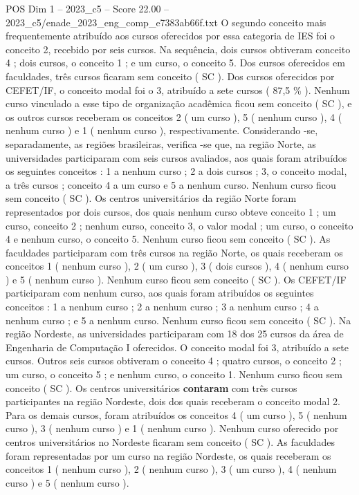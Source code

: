 \begin{textsample}{POS Dim 1 – 2023\_c5 – Score 22.00 – 2023\_c5/enade\_2023\_eng\_comp\_e7383ab66f.txt}
O segundo conceito mais frequentemente atribuído aos cursos oferecidos por essa categoria de IES foi o conceito 2, recebido por seis cursos.
Na sequência, dois cursos obtiveram conceito 4 ; dois cursos, o conceito 1 ; e um curso, o conceito 5.
Dos cursos oferecidos em faculdades, três cursos ficaram sem conceito ( SC ).
Dos cursos oferecidos por CEFET/IF, o conceito modal foi o 3, atribuído a sete cursos ( 87,5 \% ).
Nenhum curso vinculado a esse tipo de organização acadêmica ficou sem conceito ( SC ), e os outros cursos receberam os conceitos 2 ( um curso ), 5 ( nenhum curso ), 4 ( nenhum curso ) e 1 ( nenhum curso ), respectivamente.
Considerando -se, separadamente, as regiões brasileiras, verifica -se que, na região Norte, as universidades participaram com seis cursos avaliados, aos quais foram atribuídos os seguintes conceitos : 1 a nenhum curso ; 2 a dois cursos ; 3, o conceito modal, a três cursos ; conceito 4 a um curso e 5 a nenhum curso.
Nenhum curso ficou sem conceito ( SC ).
Os centros universitários da região Norte foram representados por dois cursos, dos quais nenhum curso obteve conceito 1 ; um curso, conceito 2 ; nenhum curso, conceito 3, o valor modal ; um curso, o conceito 4 e nenhum curso, o conceito 5.
Nenhum curso ficou sem conceito ( SC ).
As faculdades participaram com três cursos na região Norte, os quais receberam os conceitos 1 ( nenhum curso ), 2 ( um curso ), 3 ( dois cursos ), 4 ( nenhum curso ) e 5 ( nenhum curso ).
Nenhum curso ficou sem conceito ( SC ).
Os CEFET/IF participaram com nenhum curso, aos quais foram atribuídos os seguintes conceitos : 1 a nenhum curso ; 2 a nenhum curso ; 3 a nenhum curso ; 4 a nenhum curso ; e 5 a nenhum curso.
Nenhum curso ficou sem conceito ( SC ).
Na região Nordeste, as universidades participaram com 18 dos 25 cursos da área de Engenharia de Computação I oferecidos.
O conceito modal foi 3, atribuído a sete cursos.
Outros seis cursos obtiveram o conceito 4 ; quatro cursos, o conceito 2 ; um curso, o conceito 5 ; e nenhum curso, o conceito 1.
Nenhum curso ficou sem conceito ( SC ).
Os centros universitários \textbf{contaram} com três cursos participantes na região Nordeste, dois dos quais receberam o conceito modal 2.
Para os demais cursos, foram atribuídos os conceitos 4 ( um curso ), 5 ( nenhum curso ), 3 ( nenhum curso ) e 1 ( nenhum curso ).
Nenhum curso oferecido por centros universitários no Nordeste ficaram sem conceito ( SC ).
As faculdades foram representadas por um curso na região Nordeste, os quais receberam os conceitos 1 ( nenhum curso ), 2 ( nenhum curso ), 3 ( um curso ), 4 ( nenhum curso ) e 5 ( nenhum curso ).

\end{textsample}

